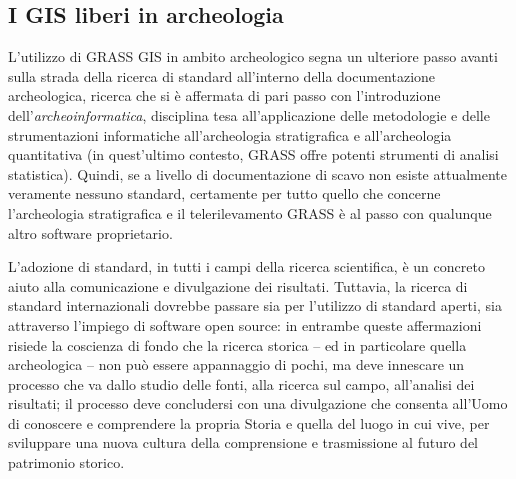 \documentclass{article}
\begin{document}
\begin{multicols}{2}
		\section{I GIS liberi in archeologia}
			L'utilizzo di GRASS GIS in ambito archeologico segna un ulteriore passo avanti sulla strada della ricerca di standard all'interno della documentazione archeologica, ricerca che si è affermata di pari passo con l'introduzione dell'\emph{archeoinformatica}, disciplina tesa all'applicazione delle metodologie e delle strumentazioni informatiche all'archeologia stratigrafica e all'archeologia quantitativa (in quest'ultimo contesto, GRASS offre potenti strumenti di analisi statistica). Quindi, se a livello di documentazione di scavo non esiste attualmente veramente nessuno standard, certamente per tutto quello che concerne l'archeologia stratigrafica e il telerilevamento GRASS è al passo con qualunque altro software proprietario.

			L'adozione di standard, in tutti i campi della ricerca scientifica, è un concreto aiuto alla comunicazione e divulgazione dei risultati. Tuttavia, la ricerca di standard internazionali dovrebbe passare sia per l'utilizzo di standard aperti, sia attraverso l'impiego di software open source: in entrambe queste affermazioni risiede la coscienza di fondo che la ricerca storica -- ed in particolare quella archeologica -- non può essere appannaggio di pochi, ma deve innescare un processo che va dallo studio delle fonti, alla ricerca sul campo, all'analisi dei risultati; il processo deve concludersi con una divulgazione che consenta all'Uomo di conoscere e comprendere la propria Storia e quella del luogo in cui vive, per sviluppare una nuova cultura della comprensione e trasmissione al futuro del patrimonio storico.


\end{multicols}
\end{document}
